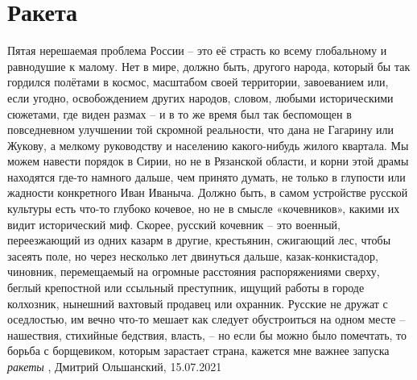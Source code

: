  
 
 
 
 
\chapter{Ракета}

Пятая нерешаемая проблема России – это её страсть ко всему глобальному и равнодушие к малому.
Нет в мире, должно быть, другого народа, который бы так гордился полётами в
космос, масштабом своей территории, завоеванием или, если угодно, освобождением
других народов, словом, любыми историческими сюжетами, где виден размах – и в
то же время был так беспомощен в повседневном улучшении той скромной
реальности, что дана не Гагарину или Жукову, а мелкому руководству и населению
какого-нибудь жилого квартала. Мы можем навести порядок в Сирии, но не в
Рязанской области, и корни этой драмы находятся где-то намного дальше, чем
принято думать, не только в глупости или жадности конкретного Иван Иваныча.
Должно быть, в самом устройстве русской культуры есть что-то глубоко кочевое,
но не в смысле «кочевников», какими их видит исторический миф. Скорее, русский
кочевник – это военный, переезжающий из одних казарм в другие, крестьянин,
сжигающий лес, чтобы засеять поле, но через несколько лет двинуться дальше,
казак-конкистадор, чиновник, перемещаемый на огромные расстояния распоряжениями
сверху, беглый крепостной или ссыльный преступник, ищущий работы в городе
колхозник, нынешний вахтовый продавец или охранник. Русские не дружат с
оседлостью, им вечно что-то мешает как следует обустроиться на одном месте –
нашествия, стихийные бедствия, власть, – но если бы можно было помечтать, то
борьба с борщевиком, которым зарастает страна, кажется мне важнее запуска
\emph{ракеты}
, Дмитрий Ольшанский, 15.07.2021

